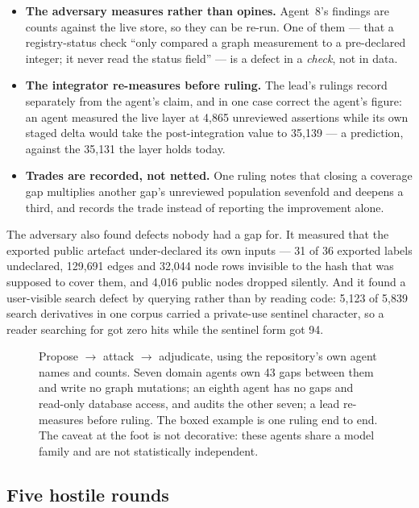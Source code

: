 \begin{itemize}[leftmargin=1.9em,itemsep=1pt,topsep=2pt]
\item \textbf{The adversary measures rather than opines.} Agent~8's findings are
counts against the live store, so they can be re-run. One of them --- that a
registry-status check ``only compared a graph measurement to a pre-declared integer;
it never read the status field'' --- is a defect in a \emph{check}, not in data.
\item \textbf{The integrator re-measures before ruling.} The lead's rulings record
 separately from the agent's claim, and in one case correct
the agent's figure: an agent measured the live layer at 4{,}865 unreviewed
assertions while its own staged delta would take the post-integration value to
35{,}139 --- a prediction, against the 35{,}131 the layer holds today.
\item \textbf{Trades are recorded, not netted.} One ruling notes that closing a
coverage gap multiplies another gap's unreviewed population sevenfold and deepens a
third, and records the trade instead of reporting the improvement alone.
\end{itemize}

The adversary also found defects nobody had a gap for. It measured that the exported
public artefact under-declared its own inputs --- 31 of 36 exported labels
undeclared, 129{,}691 edges and 32{,}044 node rows invisible to the hash that was
supposed to cover them, and 4{,}016 public nodes dropped silently. And it found a
user-visible search defect by querying rather than by reading code: 5{,}123 of 5{,}839
search derivatives in one corpus carried a private-use sentinel character, so a
reader searching for  got zero hits while the sentinel form got 94.

\begin{figure}[tbp]
\centering
\resizebox{\textwidth}{!}{}
\caption{Propose $\to$ attack $\to$ adjudicate, using the repository's own agent
names and counts. Seven domain agents own 43 gaps between them and write no graph
mutations; an eighth agent has no gaps and read-only database access, and audits the
other seven; a lead re-measures before ruling. The boxed example is one ruling
end to end. The caveat at the foot is not decorative: these agents share a model
family and are not statistically independent.}
\label{fig:adversarial}
\end{figure}

\subsection{Five hostile rounds}


